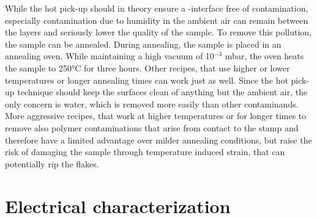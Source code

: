 While the hot pick-up should in theory ensure a \hbn-\tmdg interface free of contamination, especially contamination due to humidity in the ambient air can remain between the layers and seriously lower the quality of the sample. To remove this pollution, the sample can be annealed\cite{lin_graphene_2012}. During annealing, the sample is placed in an annealing oven. While maintaining a high vacuum of 10$^{-3}$ mbar, the oven heats the sample to 250°C for three hours. Other recipes, that use higher or lower temperatures or longer annealing times can work just as well. Since the hot pick-up technique should keep the \tmdg surfaces clean of anything but the ambient air, the only concern is water, which is removed more easily than other contaminands. 
More aggressive recipes, that work at higher temperatures or for longer times to remove also polymer contaminations that arise from contact to the stamp and therefore have a limited advantage over milder annealing conditions, but raise the risk of damaging the sample through temperature induced strain, that can potentially rip the \tmdg flakes.

\section{Electrical characterization}

